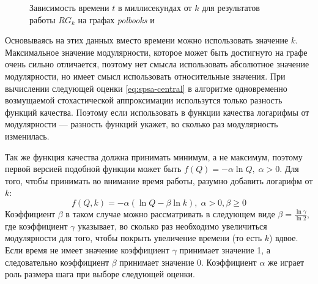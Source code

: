 \begin{figure}[H]
	\columnwidth
	\caption{Зависимость времени $t$ в миллисекундах от $k$ для результатов работы $RG_k$ на графах \emph{polbooks} и \emph{\celegans}}
\end{figure}

Основываясь на этих данных вместо времени можно использовать значение $k$. Максимальное значение модулярности, которое может быть достигнуто на графе очень сильно отличается, поэтому нет смысла использовать абсолютное значение модулярности, но имеет смысл использовать относительные значения. При вычислении следующей оценки \eqref{eq:spsa-central} в алгоритме одновременно возмущаемой стохастической аппроксимации использутся только разность функций качества. Поэтому если использовать в функции качества логарифмы от модулярности --- разность функций укажет, во сколько раз модулярность изменилась.

Так же функция качества должна принимать минимум, а не максимум, поэтому первой версией подобной функции может быть $f(Q) = -\alpha \ln Q,\;\alpha > 0$. Для того, чтобы принимать во внимание время работы, разумно добавить логарифм от $k$: 
\begin{equation} \label{eq:arg-f}
f(Q, k) = -\alpha (\ln Q - \beta \ln k),\;\alpha > 0, \beta \ge 0
\end{equation}
Коэффициент $\beta$ в таком случае можно рассматривать в следующем виде $\beta = \frac{\ln \gamma}{\ln 2}$, где коэффициент $\gamma$ указывает, во сколько раз необходимо увеличиться модулярности для того, чтобы покрыть увеличение времени (то есть $k$) вдвое. Если время не имеет значение коэффициент $\gamma$ принимает значение 1, а следовательно коэффициент $\beta$ принимает значение 0. Коэффициент $\alpha$ же играет роль размера шага при выборе следующей оценки.

